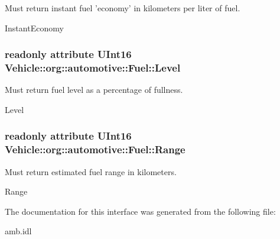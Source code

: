 Must return instant fuel 'economy' in kilometers per liter of fuel. 

Instant\-Economy \hypertarget{interfaceVehicle_1_1org_1_1automotive_1_1Fuel_a5821c2207920d786362f126ec78ac3a3}{
\subsubsection[{Level}]{\setlength{\rightskip}{0pt plus 5cm}readonly attribute U\-Int16 Vehicle\-::org\-::automotive\-::\-Fuel\-::\-Level}}\label{interfaceVehicle_1_1org_1_1automotive_1_1Fuel_a5821c2207920d786362f126ec78ac3a3}


Must return fuel level as a percentage of fullness. 

Level \hypertarget{interfaceVehicle_1_1org_1_1automotive_1_1Fuel_af113abbea5ffeca53c9d267319de39e9}{
\subsubsection[{Range}]{\setlength{\rightskip}{0pt plus 5cm}readonly attribute U\-Int16 Vehicle\-::org\-::automotive\-::\-Fuel\-::\-Range}}\label{interfaceVehicle_1_1org_1_1automotive_1_1Fuel_af113abbea5ffeca53c9d267319de39e9}


Must return estimated fuel range in kilometers. 

Range 

The documentation for this interface was generated from the following file\-:\begin{DoxyCompactItemize}
\item 
amb.\-idl\end{DoxyCompactItemize}
